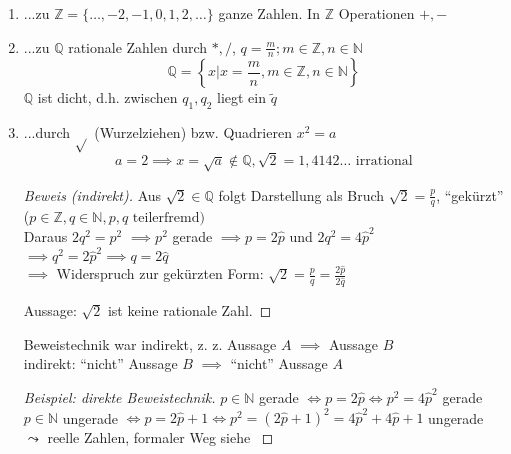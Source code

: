 \begin{enumerate}
 \item ...zu $\mathbb{Z} = \{\ldots,-2,-1,0,1,2,\ldots\}$ ganze Zahlen. In $\mathbb{Z}$ Operationen $+,-$
 \item ...zu $\mathbb{Q}$ rationale Zahlen durch $*,/$, $q=\frac{m}{n}; m \in \mathbb{Z}, n \in \mathbb{N}$
  \begin{equation*}\mathbb{Q} = \left\{x | x=\frac{m}{n}, m \in \mathbb{Z}, n \in \mathbb{N} \right\}\end{equation*}
  $\mathbb{Q}$ ist dicht, d.h. zwischen $q_1, q_2$ liegt ein $\tilde{q}$
 \item ...durch $\sqrt{}$ (Wurzelziehen) bzw. Quadrieren $x^2=a$
 \begin{equation*}a=2 \implies x = \sqrt{a} \notin \mathbb{Q}, \sqrt{2}=1,4142\ldots\text{ irrational}\end{equation*}

\begin{proof}[Beweis (indirekt)]
Aus $\sqrt{2} \in \mathbb{Q}$ folgt Darstellung als Bruch $\sqrt{2}=\frac{p}{q}$, "`gekürzt"' ($p \in \mathbb{Z}, q \in \mathbb{N}, p, q \text{ teilerfremd})$\\
Daraus $2q^2=p^2$ $\implies p^2$ gerade $\implies p=2\hat{p}$ und $2q^2=4\hat{p}^2$\\
$\implies q^2 = 2\hat{p}^2 \implies q=2\hat{q}$ \\
$\implies$ Widerspruch zur gekürzten Form: $\sqrt{2}=\frac{p}{q}=\frac{2\hat{p}}{2\hat{q}}$

Aussage: $\sqrt{2}$ ist keine rationale Zahl.
\end{proof}

Beweistechnik war indirekt, z. z. Aussage $A$ $\implies$ Aussage $B$\\
indirekt: "`nicht"' Aussage $B$ $\implies$ "`nicht"' Aussage $A$


\begin{proof}[Beispiel: direkte Beweistechnik]

$p \in \mathbb{N}$ gerade $\Leftrightarrow p = 2 \hat{p} \Leftrightarrow p^2 = 4\hat{p}^2$ gerade\\
$p \in \mathbb{N}$ ungerade $\Leftrightarrow p = 2 \hat{p}+1 \Leftrightarrow p^2 = (2\hat{p}+1)^2=4\hat{p}^2+4\hat{p}+1$ ungerade\\
$\leadsto$ reelle Zahlen, formaler Weg siehe \cite[S. 9ff]{bornemann}
\end{proof}


\end{enumerate}
